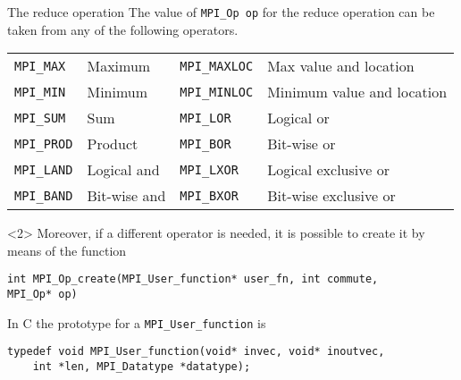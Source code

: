 \documentclass[xcolor={svgnames,usenames}]{beamer}
\begin{document}
\begin{frame}[fragile]{The reduce operation}
The value of \texttt{MPI_Op op} for the reduce operation can be taken from any of the following operators.

\begin{tabular}{ll|ll}
	\toprule
	\texttt{MPI_MAX} & Maximum & \texttt{MPI_MAXLOC} & Max value and location \\
	\texttt{MPI_MIN} & Minimum & \texttt{MPI_MINLOC} & Minimum value and location \\
	\texttt{MPI_SUM} & Sum & \texttt{MPI_LOR} & Logical or \\
	\texttt{MPI_PROD} & Product & \texttt{MPI_BOR} & Bit-wise or \\
	\texttt{MPI_LAND} & Logical and & \texttt{MPI_LXOR} & Logical exclusive or \\
	\texttt{MPI_BAND} & Bit-wise and & \texttt{MPI_BXOR} & Bit-wise exclusive or \\
	\bottomrule
\end{tabular}
\vfill
\begin{onlyenv}<2>
Moreover, if a different operator is needed, it is possible to create it by means of the function
\begin{verbatim}
int MPI_Op_create(MPI_User_function* user_fn, int commute, 
MPI_Op* op)
\end{verbatim}

In C the prototype for a \texttt{MPI_User_function} is 
\begin{verbatim}
typedef void MPI_User_function(void* invec, void* inoutvec, 
	int *len, MPI_Datatype *datatype);
\end{verbatim}
\end{onlyenv}
\end{frame}
\end{document}
